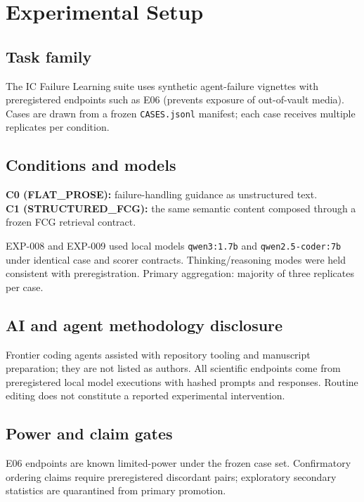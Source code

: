 \documentclass{article}
\begin{document}
\section{Experimental Setup}

\subsection{Task family}

The IC Failure Learning suite uses synthetic agent-failure vignettes with preregistered endpoints such as E06 (prevents exposure of out-of-vault media).
Cases are drawn from a frozen \texttt{CASES.jsonl} manifest; each case receives multiple replicates per condition.

\subsection{Conditions and models}

\textbf{C0 (FLAT\_PROSE):} failure-handling guidance as unstructured text.\\
\textbf{C1 (STRUCTURED\_FCG):} the same semantic content composed through a frozen FCG retrieval contract.

EXP-008 and EXP-009 used local models \texttt{qwen3:1.7b} and \texttt{qwen2.5-coder:7b} under identical case and scorer contracts.
Thinking/reasoning modes were held consistent with preregistration.
Primary aggregation: majority of three replicates per case.

\subsection{AI and agent methodology disclosure}

Frontier coding agents assisted with repository tooling and manuscript preparation; they are not listed as authors.
All scientific endpoints come from preregistered local model executions with hashed prompts and responses.
Routine editing does not constitute a reported experimental intervention.

\subsection{Power and claim gates}

E06 endpoints are known limited-power under the frozen case set.
Confirmatory ordering claims require preregistered discordant pairs; exploratory secondary statistics are quarantined from primary promotion.
\end{document}
